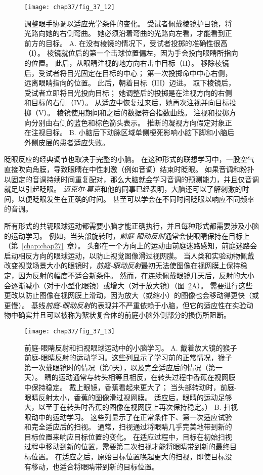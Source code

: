 \begin{figure}[htbp]
	\centering
	\texttt{[image: chap37/fig\_37\_12]}
	\caption{调整眼手协调以适应光学条件的变化。
		受试者佩戴棱镜护目镜，将光路向她的右侧弯曲。
		她必须沿着弯曲的光路向左看，才能看到正前方的目标\cite{martin1996throwing}。
		A. 在没有棱镜的情况下，受试者投掷的准确性很高（I）。
		棱镜就位后的第一个击球位置偏左，因为手会投向眼睛所指向的位置。
		此后，从眼睛注视的地方向右击中目标（II）。
		移除棱镜后，受试者将目光固定在目标的中心；
		第一次投掷命中中心右侧，远离眼睛指向的位置。
		此后，朝着目标（III）迈进。
		取下棱镜后，受试者立即将目光投向目标；
		她调整后的投掷是在注视方向的右侧和目标的右侧（IV）。
		从适应中恢复过来后，她再次注视并向目标投掷（V）。
		棱镜使用期间和之后的数据符合指数曲线。
		注视和投掷方向分别由右侧的蓝色和棕色箭头表示。
		推断的凝视方向假定对象正在注视目标。
		B. 小脑后下动脉区域单侧梗死影响小脑下脚和小脑后外侧皮层的患者适应失败。}
	\label{fig:37_12}
\end{figure}


眨眼反应的经典调节也取决于完整的小脑。
在这种形式的联想学习中，一股空气直接吹向角膜，导致眼睛在中性刺激（例如音调）结束时眨眼。
如果音调和粉扑以固定的音调持续时间重复配对，那么大脑就会学习音调的预测能力，并且仅音调就足以引起眨眼。
\textit{迈克尔$\cdot$莫克}和他的同事已经表明，大脑还可以了解刺激的时间，以便眨眼发生在正确的时间。
甚至可以学会在不同时间眨眼以响应不同频率的音调。


所有形式的共轭眼球运动都需要小脑才能正确执行，并且每种形式都需要涉及小脑的运动学习。
例如，当头部旋转时，\textit{前庭-眼动反射}通常会使眼睛保持在目标上（第~\ref{chap:chap27}~章）。
头部在一个方向上的运动由前庭迷路感知，前庭迷路会启动相反方向的眼球运动，以防止视觉图像滑过视网膜。
当人类和实验动物佩戴改变视觉场景大小的眼镜时，\textit{前庭-眼动反射}最初无法使图像在视网膜上保持稳定，因为反射的幅度不适合新条件。
然而，在连续佩戴眼镜几天后，反射的大小会逐渐减小（对于小型化眼镜）或增大（对于放大镜）（图~\ref{fig:37_13}A）。
需要进行这些更改以防止图像在视网膜上滑动，因为放大（或缩小）的图像也会移动得更快（或更慢）。
基线\textit{前庭-眼动反射}的表现并不严重依赖于小脑，但它的适应性在实验动物中确实并且可以被称为絮状复合体的前庭小脑外侧部分的损伤所阻断。


\begin{figure}[htbp]
	\centering
	\texttt{[image: chap37/fig\_37\_13]}
	\caption{前庭-眼睛反射和扫视眼球运动中的小脑学习。
		A. 戴着放大镜的猴子前庭-眼睛反射的运动学习。这些列显示了学习前的正常情况，猴子第一次戴眼镜时的情况（第0天），以及完全适应后的情况（第一天）。
		睛的运动通常与转头相等且相反，在转头过程中香蕉在视网膜中保持稳定。
		戴上眼镜，香蕉看起来更大了；
		当头部转动时，前庭-眼睛反射太小，香蕉的图像滑过视网膜。
		适应后，眼睛的运动足够大，以至于在转头时香蕉的图像在视网膜上再次保持稳定\cite{lisberger1988neural}。）
		B. 扫视眼动中的运动学习。
		这些列显示了在正常条件下、第一次适应试验和完全适应后的扫视。
		通常，扫视通过将眼睛几乎完美地带到新的目标位置来响应目标位置的变化。
		在适应过程中，目标在初始扫视过程中移动到新的位置，需要第二次扫视才能将眼睛带到新的最终目标位置。
		在适应之后，原始目标位置唤起更大的扫视，即使目标没有移动，也适合将眼睛带到新的目标位置。}
	\label{fig:37_13}
\end{figure}


